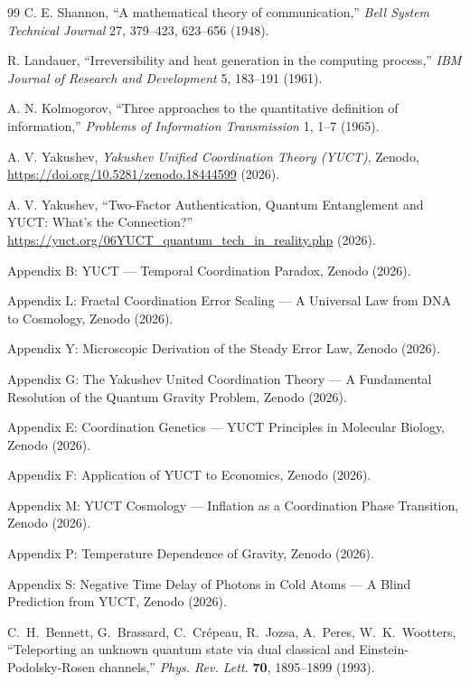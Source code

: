 \documentclass[12pt,a4paper]{article}
\theoremstyle{remark}
\begin{document}
	\begin{thebibliography}{99}
		C. E. Shannon, ``A mathematical theory of communication,'' \emph{Bell System Technical Journal} 27, 379–423, 623–656 (1948).
		
		R. Landauer, ``Irreversibility and heat generation in the computing process,'' \emph{IBM Journal of Research and Development} 5, 183–191 (1961).
		
		A. N. Kolmogorov, ``Three approaches to the quantitative definition of information,'' \emph{Problems of Information Transmission} 1, 1–7 (1965).
		
		A. V. Yakushev, \emph{Yakushev Unified Coordination Theory (YUCT)}, Zenodo, \url{https://doi.org/10.5281/zenodo.18444599} (2026).
		
		A. V. Yakushev, ``Two-Factor Authentication, Quantum Entanglement and YUCT: What's the Connection?'' \url{https://yuct.org/06YUCT_quantum_tech_in_reality.php} (2026).
		
		Appendix B: YUCT — Temporal Coordination Paradox, Zenodo (2026).
		
		Appendix L: Fractal Coordination Error Scaling — A Universal Law from DNA to Cosmology, Zenodo (2026).
		
		Appendix Y: Microscopic Derivation of the Steady Error Law, Zenodo (2026).
		
		Appendix G: The Yakushev United Coordination Theory — A Fundamental Resolution of the Quantum Gravity Problem, Zenodo (2026).
		
		Appendix E: Coordination Genetics — YUCT Principles in Molecular Biology, Zenodo (2026).
		
		Appendix F: Application of YUCT to Economics, Zenodo (2026).
		
		Appendix M: YUCT Cosmology — Inflation as a Coordination Phase Transition, Zenodo (2026).
		
		Appendix P: Temperature Dependence of Gravity, Zenodo (2026).
		
		Appendix S: Negative Time Delay of Photons in Cold Atoms — A Blind Prediction from YUCT, Zenodo (2026).
		
		 C.~H.~Bennett, G.~Brassard, C.~Crépeau, R.~Jozsa, A.~Peres, W.~K.~Wootters,
		``Teleporting an unknown quantum state via dual classical and Einstein-Podolsky-Rosen channels,''
		\emph{Phys. Rev. Lett.} \textbf{70}, 1895--1899 (1993).
		

\end{thebibliography}
\end{document}

